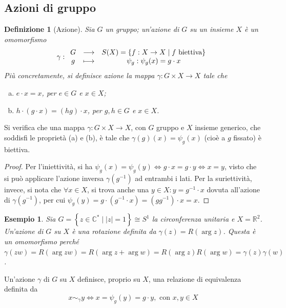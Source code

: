 \documentclass[12pt]{scrartcl}
\theoremstyle{style}
\newtheorem{esempio}{Esempio}[section]
\newtheorem{definizione}{Definizione}[section]
\numberwithin{equation}{subsection}
\begin{document}
\subsection{Azioni di gruppo}
\begin{definizione}
	[Azione]
	Sia $G$ un gruppo; un'azione di $G$ su un insieme $X$ \`e un omomorfismo
	\[
	\gamma : 
	\begin{array}
		{c c c}
		G &\longrightarrow & S(X) = \left\{ f : X \to X  \mid f \text{ biettiva} \right\} \\
		g & \longmapsto & \psi _g : \psi_g(x) = g \cdot x
	\end{array}
	\] 
Pi\`u concretamente, si definisce \textit{azione} la mappa $\gamma : G \times  X\to X$ tale che
\begin{enumerate}[(a).]
	\item $e\cdot x = x$, per $e \in G$ e $x \in X$;
	\item $h\cdot (g\cdot x) = (hg)\cdot x$, per $g, h\in G$ e $x \in X$.
\end{enumerate}
\end{definizione}
\noindent Si verifica che una mappa $\gamma : G \times  X \to X$, con $G$ gruppo e $X$ insieme generico, che soddisfi le propriet\`a (a) e (b), \`e tale che $\gamma(g) (x) = \psi _g(x)$ (cio\`e a $g$ fissato) \`e biettiva.
\begin{proof}
	Per l'iniettivit\`a, si ha $\psi _g(x) = \psi _g(y) \iff g\cdot x = g\cdot y \iff x = y$, visto che si pu\`o applicare l'azione inversa $\gamma(g^{-1})$ ad entrambi i lati.
	Per la suriettivit\`a, invece, si nota che $\forall x \in X$, si trova anche una $y\in X: y= g^{-1}\cdot x$ dovuta all'azione di $\gamma(g^{-1})$, per cui $\psi _g(y)= g \cdot \left(g^{-1}\cdot x\right) =(gg^{-1}) \cdot x = x$.
\end{proof}
\begin{esempio}
Sia $G = \left\{ z \in \mathbb{C}^*  \mid  \lvert z \rvert =1 \right\} \cong S^1$ la circonferenza unitaria e $X = \mathbb{R}^2$.
Un'azione di $G$ su $X$ \`e una rotazione definita da $\gamma(z) = R(\operatorname{arg} z)$.
Questa \`e un omomorfismo perch\'e $\gamma(zw) = R(\operatorname{arg} zw)  = R(\operatorname{arg} z +  \operatorname{arg} w) = R(\operatorname{arg} z) R(\operatorname{arg} w)= \gamma(z) \gamma(w)$.
\end{esempio}
\noindent Un'azione $\gamma$ di $G$ su $X$ definisce, proprio su $X$, una relazione di equivalenza definita da 
\begin{equation}
	x \sim _\gamma y \iff x=\psi _g(y)=g \cdot y, \text{ con } x,y \in X
\end{equation}
\end{document}
